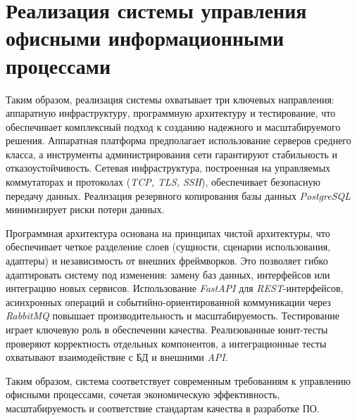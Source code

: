 \section{Реализация системы управления офисными информационными процессами}
\label{sec:system-implementation}








Таким образом, реализация системы охватывает три ключевых направления: аппаратную инфраструктуру, программную архитектуру и тестирование, что обеспечивает комплексный подход к созданию надежного и масштабируемого решения. Аппаратная платформа предполагает использование серверов среднего класса, а инструменты администрирования сети гарантируют стабильность и отказоустойчивость. Сетевая инфраструктура, построенная на управляемых коммутаторах и протоколах (\textit{TCP, TLS, SSH}), обеспечивает безопасную передачу данных. Реализация резервного копирования базы данных \textit{PostgreSQL} минимизирует риски потери данных.

Программная архитектура основана на принципах чистой архитектуры, что обеспечивает четкое разделение слоев (сущности, сценарии использования, адаптеры) и независимость от внешних фреймворков. Это позволяет гибко адаптировать систему под изменения: замену баз данных, интерфейсов или интеграцию новых сервисов. Использование \textit{FastAPI} для \textit{REST}-интерфейсов, асинхронных операций и событийно-ориентированной коммуникации через \textit{RabbitMQ} повышает производительность и масштабируемость. Тестирование играет ключевую роль в обеспечении качества. Реализованные юнит-тесты проверяют корректность отдельных компонентов, а интеграционные тесты охватывают взаимодействие с БД и внешними \textit{API}.

Таким образом, система соответствует современным требованиям к управлению офисными процессами, сочетая экономическую эффективность, масштабируемость и соответствие стандартам качества в разработке ПО.
